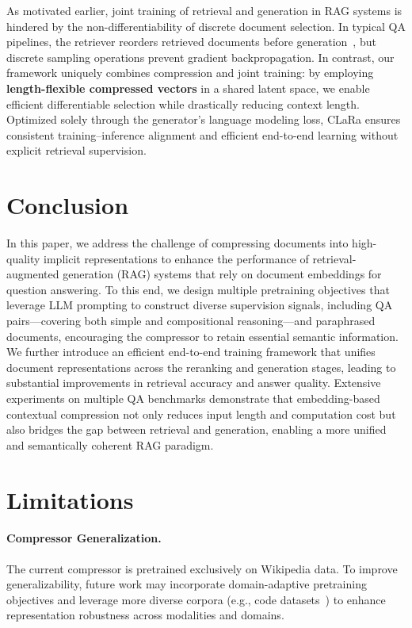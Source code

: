 \documentclass{applemlr}
\numberwithin{equation}{section}
\begin{document}
As motivated earlier, joint training of retrieval and generation in RAG systems is hindered by the non-differentiability of discrete document selection.
In typical QA pipelines, the retriever reorders retrieved documents before generation~\citep{yu2024rankrag,dong2024dontforgetconnectimproving}, but discrete sampling operations prevent gradient backpropagation.
In contrast, our framework uniquely combines compression and joint training: by employing \textbf{length-flexible compressed vectors} in a shared latent space, we enable efficient differentiable selection while drastically reducing context length. Optimized solely through the generator's language modeling loss, CLaRa ensures consistent training–inference alignment and efficient end-to-end learning without explicit retrieval supervision.


\section{Conclusion}
In this paper, we address the challenge of compressing documents into high-quality implicit representations 
to enhance the performance of retrieval-augmented generation (RAG) systems that rely on document embeddings for question answering. 
To this end, we design multiple pretraining objectives that leverage LLM prompting to construct diverse supervision signals, 
including QA pairs—covering both simple and compositional reasoning—and paraphrased documents, 
encouraging the compressor to retain essential semantic information. 
We further introduce an efficient end-to-end training framework that unifies document representations 
across the reranking and generation stages, leading to substantial improvements in retrieval accuracy and answer quality. 
Extensive experiments on multiple QA benchmarks demonstrate that embedding-based contextual compression 
not only reduces input length and computation cost but also bridges the gap between retrieval and generation, 
enabling a more unified and semantically coherent RAG paradigm.

\section*{Limitations}

\paragraph{Compressor Generalization.}
The current compressor is pretrained exclusively on Wikipedia data. 
To improve generalizability, future work may incorporate domain-adaptive pretraining objectives and leverage more diverse corpora 
(e.g., code datasets~\citep{wang2025coderagbenchretrievalaugmentcode}) to enhance representation robustness across modalities and domains.
\end{document}
